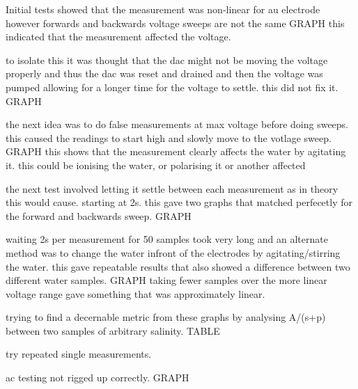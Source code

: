 Initial tests showed that the measurement was non-linear for au electrode however forwards and backwards voltage sweeps are not the same GRAPH
this indicated that the measurement affected the voltage.

to isolate this it was thought that the dac might not be moving the voltage properly and thus the dac was reset and drained and then the voltage was pumped allowing for a longer time for the voltage to settle. 
this did not fix it. GRAPH

the next idea was to do false measurements at max voltage before doing sweeps.
this caused the readings to start high and slowly move to the votlage sweep. GRAPH
this shows that the measurement clearly affects the water by agitating it.
this could be ionising the water, or polarising it or another affected

the next test involved letting it settle between each measurement as in theory this would cause. 
starting at 2s.
this gave two graphs that matched perfecetly for the forward and backwards sweep. GRAPH

waiting 2s per measurement for 50 samples took very long and an alternate method was to change the water infront of the electrodes by agitating/stirring the water.
this gave repeatable results that also showed a difference between two different water samples. GRAPH
taking fewer samples over the more linear voltage range gave something that was approximately linear.

trying to find a decernable metric from these graphs by analysing A/(s+p) between two samples of arbitrary salinity. TABLE

try repeated single measurements.

ac testing not rigged up correctly. GRAPH